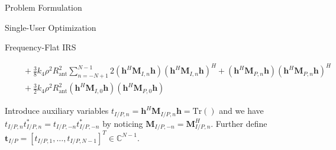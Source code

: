 \documentclass{IEEEtran}
\begin{document}
\begin{section}{Problem Formulation}
\begin{subsection}{Single-User Optimization}
\begin{subsubsection}{Frequency-Flat IRS}
\begin{figure*}[b]
\begin{equation}
\begin{split}
						&\quad+\frac{3}{8}{k_4}{\rho^2}{R_{\text{ant}}^2}\sum_{n=-N+1}^{N-1}{2(\boldsymbol{h}^H\boldsymbol{M}_{I,n}\boldsymbol{h})(\boldsymbol{h}^H\boldsymbol{M}_{I,n}\boldsymbol{h})^H+(\boldsymbol{h}^H\boldsymbol{M}_{P,n}\boldsymbol{h})(\boldsymbol{h}^H\boldsymbol{M}_{P,n}\boldsymbol{h})^H}\\
						&\quad+\frac{3}{2}{k_4}{\rho^2}{R_{\text{ant}}^2}{(\boldsymbol{h}^H\boldsymbol{M}_{I,0}\boldsymbol{h})(\boldsymbol{h}^H\boldsymbol{M}_{P,0}\boldsymbol{h})}
					\end{split}
				\end{equation}
			\end{figure*}
			Introduce auxiliary variables $t_{I/P,n}=\boldsymbol{h}^H\boldsymbol{M}_{I/P,n}\boldsymbol{h}=\mathrm{Tr}()$ and we have $t_{I/P,n}t_{I/P,n}^*=t_{I/P,-n}t_{I/P,-n}^*$ by noticing $\boldsymbol{M}_{I/P,-n}=\boldsymbol{M}_{I/P,n}^H$. Further define $\boldsymbol{t}_{I/P}=[t_{I/P,1},\dots,t_{I/P,N-1}]^T \in \mathbb{C}^{N-1}$.




\end{subsubsection}
\end{subsection}
\end{section}
\end{document}
